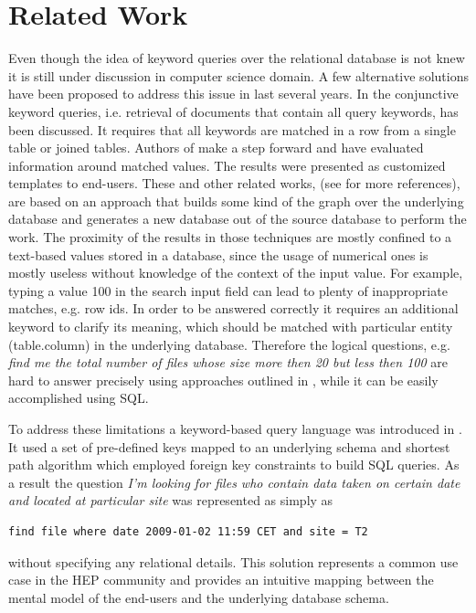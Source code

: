 \documentclass[1p,times]{elsarticle}
\begin{document}
\section{Related Work\label{RelatedWork}}
Even though the idea of keyword queries over the relational database
is not knew it is still under discussion in computer science domain.
A few alternative solutions have been proposed to address this issue
in last several years. In \cite{DBXplorer} the conjunctive keyword queries,
i.e. retrieval of documents that contain all query keywords, has
been discussed. It requires that all keywords are matched in a row from a
single table or joined tables. Authors of \cite{QueryAnswer} make a step forward
and have evaluated information around matched values. The results were presented as
customized templates to end-users. 
These and other related works, (see \cite{DBXplorer, QueryAnswer} 
for more references), are based on an approach that builds some 
kind of the graph over the underlying 
database and generates a new database out of the source database to perform the work.
The proximity of the results in those techniques are mostly confined to a 
text-based values stored in a database, since the usage of numerical ones 
is mostly useless without knowledge of the context of the input value. 
For example, typing a value 100 in the search input field can lead to 
plenty of inappropriate matches, e.g. row ids. In order to be
answered correctly it requires an additional keyword to clarify its meaning, 
which should be matched with particular entity (table.column) in the 
underlying database. Therefore the logical questions, e.g.
{\it find me the total number of files whose size more then 20 but less then 
100} are hard to answer precisely using approaches outlined in \cite{DBXplorer, QueryAnswer}, 
while it can be easily accomplished using SQL. 

To address these limitations a keyword-based query language was introduced in \cite{DBS-QL}.
It used a set of pre-defined keys mapped to an underlying schema and shortest path
algorithm which employed foreign key constraints to build SQL queries. As a result
the question
{\it I'm looking for files who contain data taken on certain date and located at
particular site} was represented as simply as \cite{DBS-QL}
\begin{verbatim}
find file where date 2009-01-02 11:59 CET and site = T2
\end{verbatim}
without specifying any relational details.
This solution represents a common use case in the HEP community and provides
an intuitive mapping between the mental model of the end-users and 
the underlying database schema.
\end{document}
